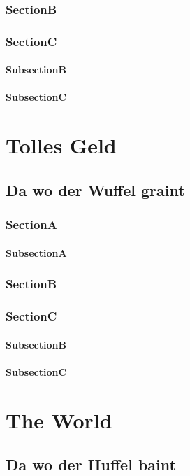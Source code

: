 \documentclass[ElegantBook]{Lilly}
\begin{document}
\section{SectionB}
\lipsum[6-8]
\section{SectionC}
\lipsum[1-2]
\subsection{SubsectionB}
\lipsum[1]
\subsection{SubsectionC}
\lipsum[2]

\part{Tolles Geld}
\chapter{Da wo der Wuffel graint}
\printMiniToc
\section{SectionA}
\subsection{SubsectionA}
\section{SectionB}
\section{SectionC}
\subsection{SubsectionB}
\subsection{SubsectionC}


\part{The World}
\chapter{Da wo der Huffel baint}
\printMiniToc
\end{document}
